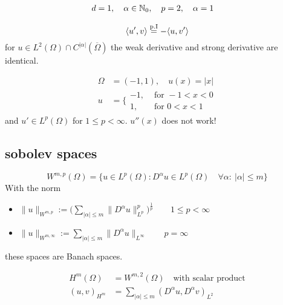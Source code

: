 \begin{example}
	\begin{align*}
	d&= 1, \quad \alpha \in \mathbb{N}_0, \quad p=2, \quad \alpha=1
	\end{align*}
	
	\begin{equation*}
	\langle u',v \rangle\overset{\text{p.I} }{=} -\langle u,v'\rangle\\
	\end{equation*}
	for $u \in L^2(\Omega)\cap C^{|\alpha|}( \overline{\Omega} )$ the weak derivative and strong derivative are identical.
\end{example}

\begin{example}

\begin{align*}
	\Omega &= (-1,1),\quad u(x) = |x|\\
	u&=  \Bigg\{
	\begin{array}{cl}
		-1 ,  &\text{ for } -1 < x < 0\\
		1 ,  &\text{ for } 0 < x <1 
	\end{array}
\end{align*}
and $u' \in L^p(\Omega)$ for $1 \leq p < \infty$. $u''(x)$ does not work!
\end{example}

\subsection{sobolev spaces}

\begin{equation*}
	W^{m,p}(\Omega) = \big\{ u\in L^p(\Omega) : D^\alpha u \in L^p(\Omega) \quad \forall \alpha:\ |\alpha|\leq m \big\}
\end{equation*}
With the norm

\begin{itemize}
	\item $\| u\|_{W^{m,p}} := \Big ( \displaystyle\sum_{|\alpha|\leq m}  \| D^\alpha u \|^p_{L^p}  \Big )^{\frac{1}{p}} \qquad 1\leq p < \infty$
	\item  $\| u\|_{W^{m,\infty}} :=  \displaystyle\sum_{|\alpha|\leq m}  \| D^\alpha u \|_{L^\infty}   \qquad  p = \infty$
\end{itemize}

these spaces are Banach spaces.


\begin{align*}
	H^m(\Omega) &= W^{m,2}(\Omega) \quad \text{with scalar product}\\
	(u,v)_{H^m} &= \displaystyle \sum_{|\alpha| \leq m} (D^\alpha u, D^\alpha v)_{L^2}
\end{align*}

